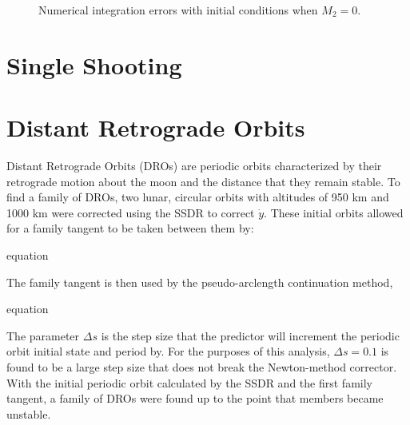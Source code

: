 \documentclass[]{aiaa-tc}%
\begin{document}
\begin{figure}[H]
{		}
	\caption{Numerical integration errors with initial conditions when $M_2=0$. }
		\label{fig:Orb_elems_m2_0_err}
	\end{figure}

\section{Single Shooting}	
\section{Distant Retrograde Orbits}	
Distant Retrograde Orbits (DROs) are periodic orbits characterized by their retrograde motion about the moon and the distance that they remain stable. To find a family of DROs, two lunar, circular orbits with altitudes of 950 km and 1000 km were corrected using the SSDR to correct $\dot{y}$. These initial orbits allowed for a family tangent to be taken between them by:

equation

The family tangent is then used by the pseudo-arclength continuation method,

equation

The parameter $\Delta s$ is the step size that the predictor will increment the periodic orbit initial state and period by. For the purposes of this analysis, $\Delta s = 0.1$ is found to be a large step size that does not break the Newton-method corrector. With the initial periodic orbit calculated by the SSDR and the first family tangent, a family of DROs were found up to the point that members became unstable.



%    
    
\end{document}

